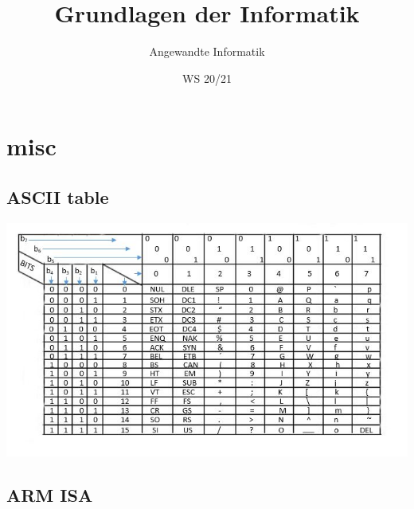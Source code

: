 \documentclass[a4paper]{scrartcl}
\author{Angewandte Informatik}
\title{Grundlagen der Informatik}
\date{WS 20/21}
\begin{document}
    \section{misc}
    \subsection{ASCII table}
        \centering\includegraphics[scale=1.1]{ascii1}
    \subsection{ARM ISA}
\end{document}
